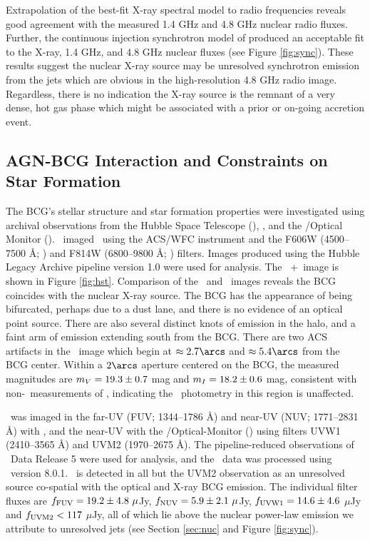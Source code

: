 \documentclass[apjpt4]{aastex}
\begin{document}
Extrapolation of the best-fit X-ray spectral model to radio
frequencies reveals good agreement with the measured 1.4 GHz and 4.8
GHz nuclear radio fluxes. Further, the continuous injection
synchrotron model of \citet{1987MNRAS.225..335H} produced an
acceptable fit to the X-ray, 1.4 GHz, and 4.8 GHz nuclear fluxes (see
Figure \ref{fig:sync}). These results suggest the nuclear X-ray source
may be unresolved synchrotron emission from the jets which are obvious
in the high-resolution 4.8 GHz radio image. Regardless, there is no
indication the X-ray source is the remnant of a very dense, hot gas
phase which might be associated with a prior or on-going accretion
event.

\subsection{AGN-BCG Interaction and Constraints on Star Formation}
\label{sec:bcg}

The BCG's stellar structure and star formation properties were
investigated using archival observations from the Hubble Space
Telescope (\hst), \galex, and the \xmm/Optical Monitor
(\xom). \hst\ imaged \rbs\ using the ACS/WFC instrument and the F606W
(4500--7500 \AA; \myv) and F814W (6800--9800 \AA; \myi)
filters. Images produced using the Hubble Legacy Archive pipeline
version 1.0 were used for analysis. The \hst\ \myv+\myi\ image is
shown in Figure \ref{fig:hst}. Comparison of the \hst\ and
\cxo\ images reveals the BCG coincides with the nuclear X-ray
source. The BCG has the appearance of being bifurcated, perhaps due to
a dust lane, and there is no evidence of an optical point
source. There are also several distinct knots of emission in the halo,
and a faint arm of emission extending south from the BCG. There are
two ACS artifacts in the \myi\ image which begin at $\approx 2.7\arcs$
and $\approx 5.4\arcs$ from the BCG center. Within a $2\arcs$ aperture
centered on the BCG, the measured magnitudes are $m_{V} = 19.3 \pm
0.7$ mag and $m_{I} = 18.2 \pm 0.6$ mag, consistent with
non-\hst\ measurements of \citet{rbs1}, indicating the
\hst\ photometry in this region is unaffected.

\rbs\ was imaged in the far-UV (FUV; 1344--1786 \AA) and near-UV (NUV;
1771--2831 \AA) with \galex, and the near-UV with the
\xmm/Optical-Monitor (\xom) using filters UVW1 (2410--3565 \AA) and
UVM2 (1970--2675 \AA). The pipeline-reduced observations of
\galex\ Data Release 5 were used for analysis, and the \xom\ data was
processed using \sas\ version 8.0.1. \rbs\ is detected in all but the
UVM2 observation as an unresolved source co-spatial with the optical
and X-ray BCG emission. The individual filter fluxes are $f_{\rm{FUV}}
= 19.2 \pm 4.8 ~\mu$Jy, $f_{\rm{NUV}} = 5.9 \pm 2.1 ~\mu$Jy,
$f_{\rm{UVW1}} = 14.6 \pm 4.6$ $\mu$Jy and $f_{\rm{UVM2}} < 117$
$\mu$Jy, all of which lie above the nuclear power-law emission we
attribute to unresolved jets (see Section \ref{sec:nuc} and Figure
\ref{fig:sync}).
\end{document}
